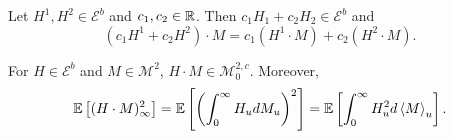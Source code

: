 \begin{lem}
    Let $H^1,H^2 \in \mathcal{E}^b$ and $c_1,c_2 \in \mathbb{R}$. Then $c_1H_1 + c_2H_2 \in \mathcal{E}^b$ and
    \begin{equation*}
        (c_1H^1+ c_2H^2) \cdot M = c_1 (H^1 \cdot M) + c_2 (H^2 \cdot M).
    \end{equation*}
\end{lem}

\begin{prop}
    For $H \in \mathcal{E}^b$ and $M \in \mathcal{M}^2$, $H \cdot M \in \mathcal{M}^{2,c}_0$. Moreover,
    \begin{equation*}
        \mathbb{E}\left[(H \cdot M)^2_\infty\right] = \mathbb{E}\left[\left(\int_0^\infty H_udM_u\right)^2\right] = \mathbb{E}\left[\int_0^\infty H_u^2 d \left\langle M \right\rangle_u\right].
    \end{equation*}
\end{prop}
